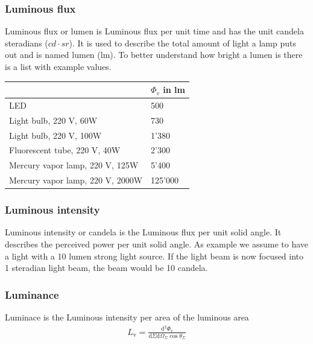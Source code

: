 \subsubsection{Luminous flux}
Luminous flux or lumen is Luminous flux per unit time and has the unit candela steradians ($cd\cdot sr$). It is used to describe the total amount of light a lamp puts out and is named lumen (lm). To better understand how bright a lumen is there is a list with example values. \\


\begin{tabular}{ |p{12cm} p{2cm}|  }
		\hline
		& $\Phi_v$ in lm\\
		
		
		\hline
		LED		& 500\\
		Light bulb, 220 V, 60W		& 730\\
		Light bulb, 220 V, 100W		& 1'380\\
		Fluorescent tube, 220 V, 40W		& 2'300\\
		Mercury vapor lamp, 220 V, 125W		& 5'400\\
		Mercury vapor lamp, 220 V, 2000W		& 125'000\\
		\hline
\end{tabular}



\subsubsection{Luminous intensity}
Luminous intensity or candela is the Luminous flux per unit solid angle. It describes the perceived power per unit solid angle. As example we assume to have a light with a 10 lumen strong light source. If the light beam is now focused into 1 steradian light beam, the beam would be 10 candela.\\

\subsubsection{Luminance}
Luminace is the Luminous intensity per area of the luminous area
\begin{align*}
L_{\mathrm{v}}=\frac{\mathrm{d}^{2} \Phi_{\mathrm{v}}}{\mathrm{d} \Sigma \mathrm{d} \Omega_{\Sigma} \cos \theta_{\Sigma}}
\end{align*}\\

